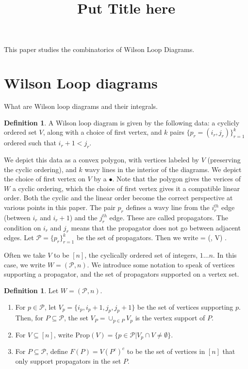 \documentclass[11pt]{article}
\title{Put Title here}
\def\bas #1\eas{\begin{align*} #1 \end{align*}}
\newcommand{\cP}{\mathcal{P}}
\newcommand{\Prop}{\textrm{Prop}}
\theoremstyle{remark}
\theoremstyle{definition}
\newtheorem{dfn}[thm]{Definition}
\begin{document}
This paper studies the combinatorics of Wilson Loop Diagrams.
\section{Wilson Loop diagrams}\label{section background}

What are Wilson loop diagrams and their integrals.

\begin{dfn}\label{WLdfn}
A Wilson loop diagram is given by the following data: a cyclicly ordered set $V$, along with a choice of first vertex, and $k$ pairs $\{p_r = (i_r, j_r)\}_{r=1}^k$ ordered such that $i_r +1 < j_r$. \end{dfn}

We depict this data as a convex polygon, with vertices labeled by $V$ (preserving the cyclic ordering), and $k$ wavy lines in the interior of the diagrams. We depict the choice of first vertex on $V$ by a $\bullet$. Note that the polygon gives the verices of $W$ a cyclic ordering, which the choice of first vertex gives it a compatible linear order. Both the cyclic and the linear order become the correct perspective at various points in this paper. The pair $p_r$ defines a wavy line from the $i_r^{th}$ edge (between $i_r$ and $i_r+1$) and the $j_r^{th}$ edge. These are called propagators.  The condition on $i_r$ and $j_r$ means that the propagator does not go between adjacent edges. Let $\cP = \{p_r\}_{r=1}^k$ be the set of propagators. Then we write \bas W = (\cP, V) \;.\eas

Often we take $V$ to be $[n]$, the cyclically ordered set of integers, $1 \ldots n$. In this case, we write $W = (\cP, n)$. We introduce some notation to speak of vertices supporting a propagator, and the set of propagators supported on a vertex set.

\begin{dfn} \label{VPropdfn}
Let $W = (\cP, n)$.
\begin{enumerate}
\item For $p \in \cP$, let $V_p = \{i_p, i_p+1, j_p, j_p+1\}$ be the set of vertices supporting $p$. Then, for $P \subseteq \cP$, the set $V_P = \cup_{p \in P} V_p$ is the vertex support of $P$.
\item For $V \subseteq [n]$, write $\Prop(V) = \{ p \in \cP | V_p \cap V \neq \emptyset \} $.
\item For $P \subseteq \cP$, define $F(P) = V(P^c)^c$ to be the set of vertices in $[n]$ that only support propagators in the set $P$.
\end{enumerate}
\end{dfn}
\end{document}
